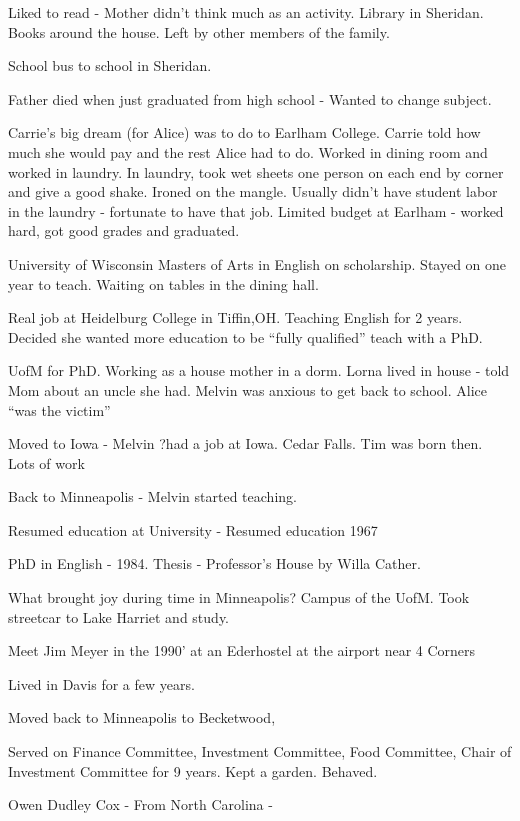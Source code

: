 \documentclass[
]{book}
\begin{document}
Liked to read - Mother didn't think much as an activity. Library in Sheridan. Books around the house. Left by other members of the family.

School bus to school in Sheridan.

Father died when just graduated from high school - Wanted to change subject.

Carrie's big dream (for Alice) was to do to Earlham College. Carrie told how much she would pay and the rest Alice had to do. Worked in dining room and worked in laundry. In laundry, took wet sheets one person on each end by corner and give a good shake. Ironed on the mangle. Usually didn't have student labor in the laundry - fortunate to have that job. Limited budget at Earlham - worked hard, got good grades and graduated.

University of Wisconsin Masters of Arts in English on scholarship. Stayed on one year to teach. Waiting on tables in the dining hall.

Real job at Heidelburg College in Tiffin,OH. Teaching English for 2 years. Decided she wanted more education to be ``fully qualified'' teach with a PhD.

UofM for PhD. Working as a house mother in a dorm. Lorna lived in house - told Mom about an uncle she had. Melvin was anxious to get back to school. Alice ``was the victim''

Moved to Iowa - Melvin ?had a job at Iowa. Cedar Falls. Tim was born then. Lots of work

Back to Minneapolis - Melvin started teaching.

Resumed education at University - Resumed education 1967

PhD in English - 1984. Thesis - Professor's House by Willa Cather.

What brought joy during time in Minneapolis? Campus of the UofM. Took streetcar to Lake Harriet and study.

Meet Jim Meyer in the 1990' at an Ederhostel at the airport near 4 Corners

Lived in Davis for a few years.

Moved back to Minneapolis to Becketwood,

Served on Finance Committee, Investment Committee, Food Committee, Chair of Investment Committee for 9 years. Kept a garden. Behaved.

Owen Dudley Cox - From North Carolina -
\end{document}
